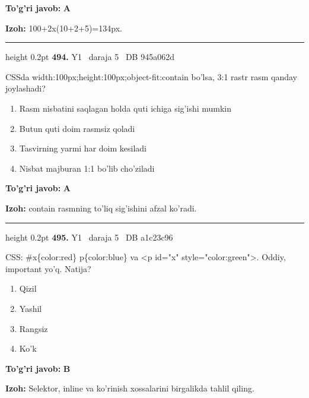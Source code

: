 \documentclass[10pt,a4paper,oneside]{article}
\begin{document}
\begin{tcolorbox}[enhanced,breakable,colback=teal!4,colframe=teal!45!black,boxrule=0.45pt,arc=1.2mm,left=2.8mm,right=2.8mm,top=2mm,bottom=2mm,before skip=2mm,after skip=2mm]
\textbf{\color{teal}To'g'ri javob:} \textbf{A}
\par\smallskip
\textbf{Izoh:} 100+2x(10+2+5)=134px.
\end{tcolorbox}
\vspace{2mm}\hrule height 0.2pt \vspace{4mm}
\hypertarget{q494}{\textbf{\color{ink}494.}}  {\color{muted}\scriptsize Y1 \textbullet\ daraja 5 \textbullet\ DB 945a062d}
\par
CSSda width:100px;height:100px;object-fit:contain bo'lsa, 3:1 rastr rasm qanday joylashadi?
\begin{enumerate}[label=\Alph*),leftmargin=9mm]
\item Rasm nisbatini saqlagan holda quti ichiga sig'ishi mumkin
\item Butun quti doim rasmsiz qoladi
\item Tasvirning yarmi har doim kesiladi
\item Nisbat majburan 1:1 bo'lib cho'ziladi
\end{enumerate}
\begin{tcolorbox}[enhanced,breakable,colback=teal!4,colframe=teal!45!black,boxrule=0.45pt,arc=1.2mm,left=2.8mm,right=2.8mm,top=2mm,bottom=2mm,before skip=2mm,after skip=2mm]
\textbf{\color{teal}To'g'ri javob:} \textbf{A}
\par\smallskip
\textbf{Izoh:} contain rasmning to'liq sig'ishini afzal ko'radi.
\end{tcolorbox}
\vspace{2mm}\hrule height 0.2pt \vspace{4mm}
\hypertarget{q495}{\textbf{\color{ink}495.}}  {\color{muted}\scriptsize Y1 \textbullet\ daraja 5 \textbullet\ DB a1c23c96}
\par
CSS: \#x\{color:red\} p\{color:blue\} va \textless{}p id="x" style="color:green"\textgreater{}. Oddiy, important yo'q. Natija?
\begin{enumerate}[label=\Alph*),leftmargin=9mm]
\item Qizil
\item Yashil
\item Rangsiz
\item Ko'k
\end{enumerate}
\begin{tcolorbox}[enhanced,breakable,colback=teal!4,colframe=teal!45!black,boxrule=0.45pt,arc=1.2mm,left=2.8mm,right=2.8mm,top=2mm,bottom=2mm,before skip=2mm,after skip=2mm]
\textbf{\color{teal}To'g'ri javob:} \textbf{B}
\par\smallskip
\textbf{Izoh:} Selektor, inline va ko'rinish xossalarini birgalikda tahlil qiling.
\end{tcolorbox}
\end{document}
